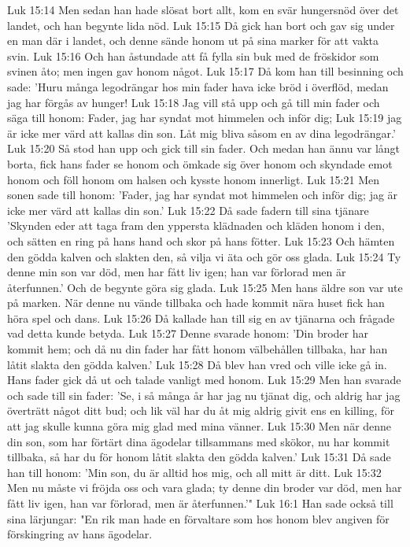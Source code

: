 Luk 15:14  Men sedan han hade slösat bort allt, kom en svär hungersnöd över det landet, och han begynte lida nöd.
Luk 15:15  Då gick han bort och gav sig under en man där i landet, och denne sände honom ut på sina marker för att vakta svin.
Luk 15:16  Och han åstundade att få fylla sin buk med de fröskidor som svinen åto; men ingen gav honom något.
Luk 15:17  Då kom han till besinning och sade: 'Huru många legodrängar hos min fader hava icke bröd i överflöd, medan jag har förgås av hunger!
Luk 15:18  Jag vill stå upp och gå till min fader och säga till honom: Fader, jag har syndat mot himmelen och inför dig;
Luk 15:19  jag är icke mer värd att kallas din son. Låt mig bliva såsom en av dina legodrängar.'
Luk 15:20  Så stod han upp och gick till sin fader. Och medan han ännu var långt borta, fick hans fader se honom och ömkade sig över honom och skyndade emot honom och föll honom om halsen och kysste honom innerligt.
Luk 15:21  Men sonen sade till honom: 'Fader, jag har syndat mot himmelen och inför dig; jag är icke mer värd att kallas din son.'
Luk 15:22  Då sade fadern till sina tjänare 'Skynden eder att taga fram den yppersta klädnaden och kläden honom i den, och sätten en ring på hans hand och skor på hans fötter.
Luk 15:23  Och hämten den gödda kalven och slakten den, så vilja vi äta och gör oss glada.
Luk 15:24  Ty denne min son var död, men har fått liv igen; han var förlorad men är återfunnen.' Och de begynte göra sig glada.
Luk 15:25  Men hans äldre son var ute på marken. När denne nu vände tillbaka och hade kommit nära huset fick han höra spel och dans.
Luk 15:26  Då kallade han till sig en av tjänarna och frågade vad detta kunde betyda.
Luk 15:27  Denne svarade honom: 'Din broder har kommit hem; och då nu din fader har fått honom välbehållen tillbaka, har han låtit slakta den gödda kalven.'
Luk 15:28  Då blev han vred och ville icke gå in. Hans fader gick då ut och talade vanligt med honom.
Luk 15:29  Men han svarade och sade till sin fader: 'Se, i så många år har jag nu tjänat dig, och aldrig har jag överträtt något ditt bud; och lik väl har du åt mig aldrig givit ens en killing, för att jag skulle kunna göra mig glad med mina vänner.
Luk 15:30  Men när denne din son, som har förtärt dina ägodelar tillsammans med skökor, nu har kommit tillbaka, så har du för honom låtit slakta den gödda kalven.'
Luk 15:31  Då sade han till honom: 'Min son, du är alltid hos mig, och all mitt är ditt.
Luk 15:32  Men nu måste vi fröjda oss och vara glada; ty denne din broder var död, men har fått liv igen, han var förlorad, men är återfunnen.'"
Luk 16:1  Han sade också till sina lärjungar: "En rik man hade en förvaltare som hos honom blev angiven för förskingring av hans ägodelar.
